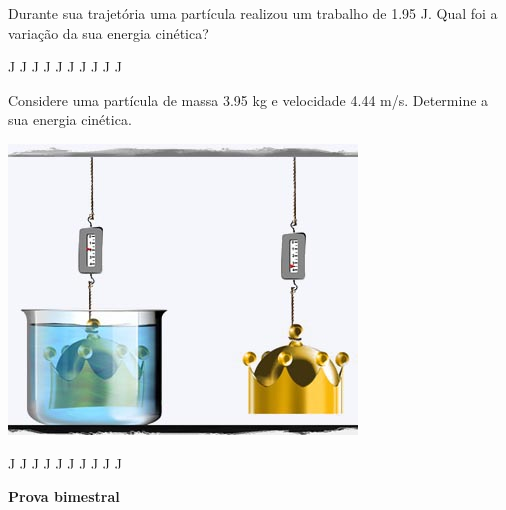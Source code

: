 \documentclass[12pt, addpoints]{exam}
\begin{document}
\begin{questions}
\begin{multicols*}{2}
\question[33] Durante sua trajetória uma partícula realizou um trabalho de    1.95 J. Qual foi a variação da sua energia cinética?

\begin{oneparchoices}
 J J J J J J J J J J\end{oneparchoices}
\question[23] Considere uma partícula de massa    3.95 kg e velocidade    4.44 m/s. Determine a sua energia cinética.

\begin{center}
\begin{minipage}[c]{0.75\linewidth}
\includegraphics[width=\textwidth]{MWE001.jpg}
\end{minipage}

\end{center}
\begin{oneparchoices}
 J J J J J J J J J J\end{oneparchoices}
\end{multicols*}
\end{questions}
\newpage
\begin{minipage}[l]{0.5\linewidth}
    \begin{flushleft}
        {\bf \Large Prova bimestral}
    \end{flushleft}
\end{minipage}
\end{document}
